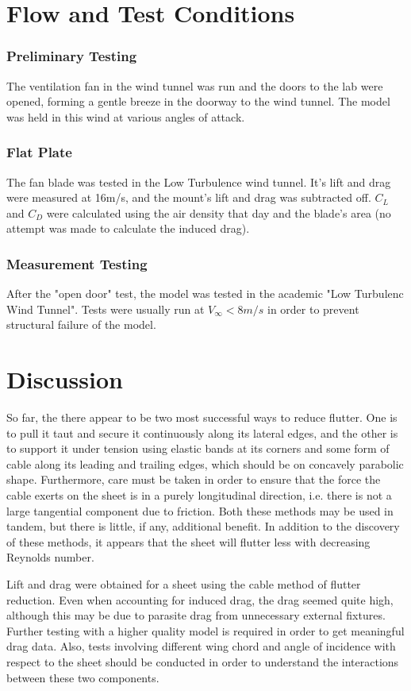 \documentclass[12pt]{report} %
\begin{document}
\chapter{Flow and Test Conditions}
\subsection{Preliminary Testing}
The ventilation fan in the wind tunnel was run and the doors to the lab were opened, forming a gentle breeze in the doorway to the wind
tunnel.  The model was held in this wind at various angles of attack.

\subsection{Flat Plate}
The fan blade was tested in the Low Turbulence wind tunnel.  It's lift and drag were measured at 16m/s, and the mount's lift and drag
was subtracted off.  $C_L$ and $C_D$ were calculated using the air density that day and the blade's area (no attempt was made to
calculate the induced drag).

\subsection{Measurement Testing}
After the "open door" test, the model was tested in the academic "Low Turbulenc Wind Tunnel". Tests were usually run at $V_\infty < 8m/s$ in
order to prevent structural failure of the model.

\chapter{Discussion}

So far, the there appear to be two most successful ways to reduce flutter. One is to pull it taut and secure it continuously along its lateral
edges, and the other is to support it under tension using elastic bands at its corners and some form of cable along its leading and trailing
edges, which should be on concavely parabolic shape. Furthermore, care must be taken in order to ensure that the force the cable exerts on
the sheet is in a purely longitudinal direction, i.e. there is not a large tangential component due to friction. Both these methods may be
used in tandem, but there is little, if any, additional benefit. In addition to the discovery of these methods,
it appears that the sheet will flutter less with decreasing Reynolds number.

Lift and drag were obtained for a sheet using the cable method of flutter reduction. Even when accounting for induced drag, the drag seemed quite
high, although this may be due to parasite drag from unnecessary external fixtures. Further testing with a higher quality model is required
in order to get meaningful drag data. Also, tests involving different wing chord and angle of incidence with respect to the sheet should be
conducted in order to understand the interactions between these two components.

\begin{thebibliography}{9}
\end{thebibliography}
\end{document}
